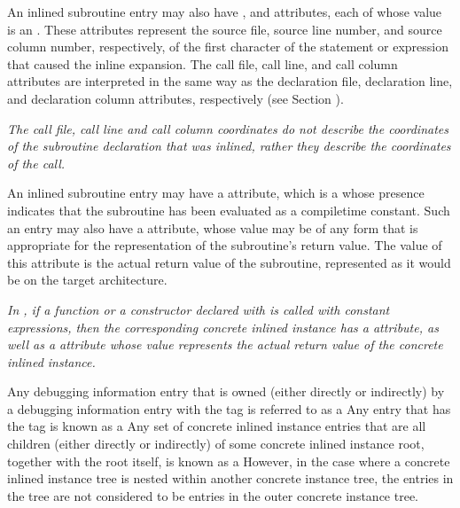 An inlined\hypertarget{chap:DWATcalllinelinenumberofinlinedsubroutinecall}{}
subroutine\hypertarget{chap:DWATcallcolumncolumnpositionofinlinedsubroutinecall}{}
entry\hypertarget{chap:DWATcallfilefilecontaininginlinedsubroutinecall}{}
may also have \DWATcallfileDEFN,
\DWATcalllineDEFN{} and \DWATcallcolumnDEFN{} attributes,
each of whose
value is an . 
These attributes represent the
source file, source line number, and source column number,
respectively, of the first character of the statement or
expression that caused the inline expansion. The call file,
call line, and call column attributes are interpreted in
the same way as the declaration file, declaration line, and
declaration column attributes, respectively (see 
Section ).

\textit{The call file, call line and call column coordinates do not
describe the coordinates of the subroutine declaration that
was inlined, rather they describe the coordinates of the call.
}

An inlined subroutine entry may have
a\hypertarget{chap:DWATconstexprcompiletimeconstantfunction}{}
\DWATconstexprDEFN{} attribute, 
which is a  
whose presence indicates that the
subroutine has been evaluated as a compile\dash time constant. Such
an entry may also have a \DWATconstvalue{} attribute,
whose value may be of any form that is appropriate for the
representation of the subroutine's return value. The value of
this attribute is the actual return value of the subroutine,
represented as it would be on the target architecture.

\textit{In , if a function or a constructor declared with 
is called with constant expressions, then the corresponding
concrete inlined instance has a 
\DWATconstexpr{} attribute,
as well as a \DWATconstvalue{} attribute whose value represents
the actual return value of the concrete inlined instance.}

Any debugging information entry that is owned (either
directly or indirectly) by a debugging information entry
with the tag \DWTAGinlinedsubroutine{} is referred to as a
 Any entry that has
the tag 
\DWTAGinlinedsubroutine{} 
is known as a  
Any set of concrete inlined instance
entries that are all children (either directly or indirectly)
of some concrete inlined instance root, together with the root
itself, is known as a 
However, in the case where a concrete inlined instance tree
is nested within another concrete instance tree, the entries
in the  tree 
are not considered to
be entries in the outer concrete instance tree.

